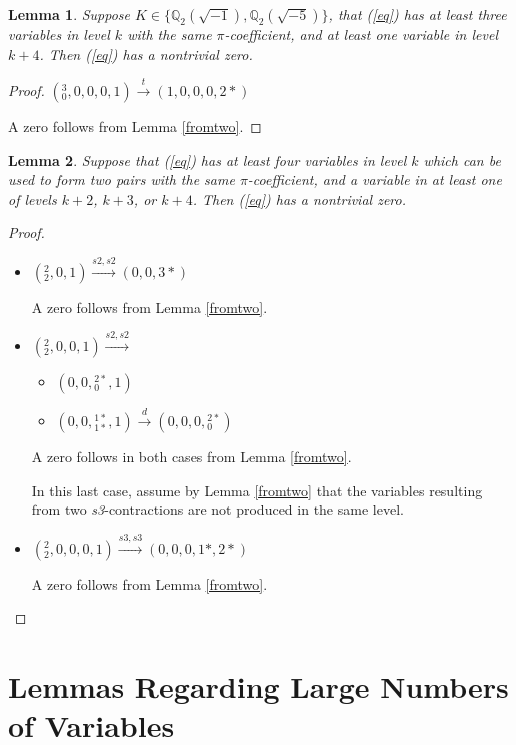 \documentclass[12pt]{amsart}
\newtheorem{lemma}{Lemma}
\begin{document}
\begin{lemma}\label{empty4}
Suppose $K \in \{\mathbb{Q}_2(\sqrt{-1}), \mathbb{Q}_2(\sqrt{-5})\}$, that (\ref{eq}) has at least three variables in level $k$  with the same $\pi$-coefficient, and at least one variable in level $k+4$.  Then (\ref{eq}) has a nontrivial zero.
\end{lemma}
\begin{proof}
$({}^{3}_{0}, 0, 0, 0, 1) \xrightarrow{t} (1, 0, 0, 0, 2*)$

A zero follows from Lemma \ref{fromtwo}.
\end{proof}

\begin{lemma} \label{empty234}
Suppose that (\ref{eq}) has at least four variables in level $k$ which can be used to form two pairs with the same $\pi$-coefficient, and a variable in at least one of levels $k+2$, $k+3$, or $k+4$.  Then (\ref{eq}) has a nontrivial zero.
\end{lemma}
\begin{proof}
\begin{itemize}
    \item $({}^{2}_{2}, 0, 1) \xrightarrow{s2, s2} (0, 0, 3*)$
    
    A zero follows from Lemma \ref{fromtwo}.
    
    \item $({}^{2}_{2}, 0, 0 ,1) \xrightarrow{s2,s2}$ 
    \begin{itemize}
        \item $(0, 0, {}^{2*}_{0}, 1)$
        \item $(0, 0, {}^{1*}_{1*}, 1) \xrightarrow{d} (0, 0, 0, {}^{2*}_{0})$
    \end{itemize}
    
    A zero follows in both cases from Lemma \ref{fromtwo}.
    
    In this last case, assume by Lemma \ref{fromtwo} that the variables resulting from two \textit{s3}-contractions are not produced in the same level.
    
    \item $({}^{2}_{2}, 0, 0 ,0, 1) \xrightarrow{s3, s3} (0, 0, 0, 1*, 2*)$
    
    A zero follows from Lemma \ref{fromtwo}.
\end{itemize}

\end{proof}

\section{Lemmas Regarding Large Numbers of Variables}
\end{document}
